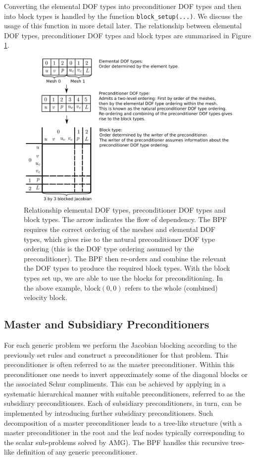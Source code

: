 Converting the elemental DOF types into preconditioner DOF types and then into 
block types is handled by the function \texttt{block\_\allowbreak setup(...)}.
We discuss the usage of this function in more detail later. The relationship 
between elemental DOF types, preconditioner DOF types and block types are 
summarised in Figure \ref{fig:dof_block_type_relations_crop}.
\begin{figure}[H]
\centering
\includegraphics[width=1\textwidth]{./pic/dof_block_type_relations_crop.pdf}
\caption{Relationship elemental DOF types, preconditioner DOF types and block
  types. The arrow indicates the flow of dependency. The BPF requires the
  correct ordering of the meshes and elemental DOF types, which gives rise to
  the natural preconditioner DOF type ordering (this is the DOF type ordering
  assumed by the preconditioner). The BPF then re-orders and combine the
  relevant the DOF types to produce the required block types. With the block
  types set up, we are able to use the blocks for preconditioning. In the above
  example, block$(0,0)$ refers to the whole (combined) velocity block.}
\label{fig:dof_block_type_relations_crop}
\end{figure}


\subsection{Master and Subsidiary Preconditioners\label{sec:master_and_subsidiary_preconditioners}}
For each generic problem we perform the Jacobian blocking according to the
previously set rules and construct a preconditioner for that problem.  This
preconditioner is often referred to as the master preconditioner. Within this
preconditioner one needs to invert approximately some of the diagonal blocks or
the associated Schur compliments. This can be achieved by applying in a
systematic hierarchical manner with suitable preconditioners, referred to as
the subsidiary preconditioners. Each of subsidiary preconditioners, in turn,
can be implemented by introducing further subsidiary preconditioners. Such
decomposition of a master preconditioner leads to a tree-like structure (with a
master preconditioner in the root and the leaf nodes typically corresponding to
the scalar sub-problems solved by AMG). The BPF handles this recursive
tree-like definition of any generic preconditioner.

